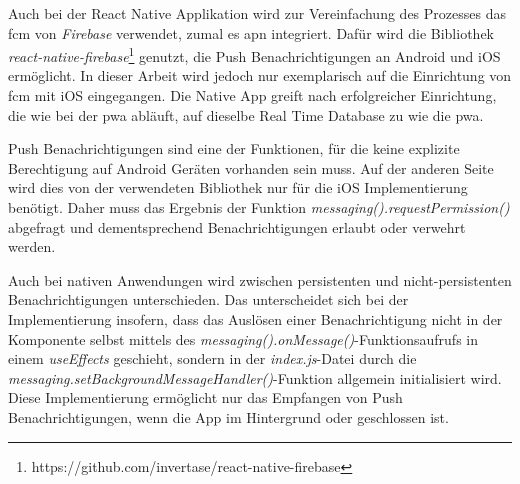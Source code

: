 Auch bei der React Native Applikation wird zur Vereinfachung des Prozesses das \ac{fcm} von \textit{Firebase} verwendet, zumal es \ac{apn} integriert.
Dafür wird die Bibliothek \textit{react-native-firebase}\footnote{https://github.com/invertase/react-native-firebase} genutzt, die Push Benachrichtigungen an Android und iOS ermöglicht.
In dieser Arbeit wird jedoch nur exemplarisch auf die Einrichtung von \ac{fcm} mit iOS eingegangen.
Die Native App greift nach erfolgreicher Einrichtung, die wie bei der \ac{pwa} abläuft, auf dieselbe Real Time Database zu wie die \ac{pwa}.

Push Benachrichtigungen sind eine der Funktionen, für die keine explizite Berechtigung auf Android Geräten vorhanden sein muss.
Auf der anderen Seite wird dies von der verwendeten Bibliothek nur für die iOS Implementierung benötigt.
Daher muss das Ergebnis der Funktion \textit{messaging().requestPermission()} abgefragt und dementsprechend Benachrichtigungen erlaubt oder verwehrt werden.

Auch bei nativen Anwendungen wird zwischen persistenten und nicht-persistenten Benachrichtigungen unterschieden.
Das unterscheidet sich bei der Implementierung insofern, dass das Auslösen einer Benachrichtigung nicht in der Komponente selbst mittels des \textit{messaging().onMessage()}-Funktionsaufrufs in einem \textit{useEffects} geschieht, sondern in der \textit{index.js}-Datei durch die \textit{messaging.setBackgroundMessageHandler()}-Funktion allgemein initialisiert wird.
Diese Implementierung ermöglicht nur das Empfangen von Push Benachrichtigungen, wenn die App im Hintergrund oder geschlossen ist.